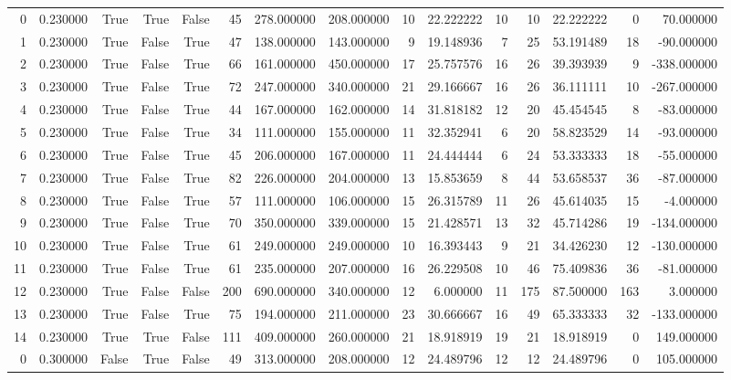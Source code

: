 \begin{table}[htbp]
\begin{tabular}{rrrrrrrrrrrrrrr}
0 & 0.230000 & True & True & False & 45 & 278.000000 & 208.000000 & 10 & 22.222222 & 10 & 10 & 22.222222 & 0 & 70.000000 \\
1 & 0.230000 & True & False & True & 47 & 138.000000 & 143.000000 & 9 & 19.148936 & 7 & 25 & 53.191489 & 18 & -90.000000 \\
2 & 0.230000 & True & False & True & 66 & 161.000000 & 450.000000 & 17 & 25.757576 & 16 & 26 & 39.393939 & 9 & -338.000000 \\
3 & 0.230000 & True & False & True & 72 & 247.000000 & 340.000000 & 21 & 29.166667 & 16 & 26 & 36.111111 & 10 & -267.000000 \\
4 & 0.230000 & True & False & True & 44 & 167.000000 & 162.000000 & 14 & 31.818182 & 12 & 20 & 45.454545 & 8 & -83.000000 \\
5 & 0.230000 & True & False & True & 34 & 111.000000 & 155.000000 & 11 & 32.352941 & 6 & 20 & 58.823529 & 14 & -93.000000 \\
6 & 0.230000 & True & False & True & 45 & 206.000000 & 167.000000 & 11 & 24.444444 & 6 & 24 & 53.333333 & 18 & -55.000000 \\
7 & 0.230000 & True & False & True & 82 & 226.000000 & 204.000000 & 13 & 15.853659 & 8 & 44 & 53.658537 & 36 & -87.000000 \\
8 & 0.230000 & True & False & True & 57 & 111.000000 & 106.000000 & 15 & 26.315789 & 11 & 26 & 45.614035 & 15 & -4.000000 \\
9 & 0.230000 & True & False & True & 70 & 350.000000 & 339.000000 & 15 & 21.428571 & 13 & 32 & 45.714286 & 19 & -134.000000 \\
10 & 0.230000 & True & False & True & 61 & 249.000000 & 249.000000 & 10 & 16.393443 & 9 & 21 & 34.426230 & 12 & -130.000000 \\
11 & 0.230000 & True & False & True & 61 & 235.000000 & 207.000000 & 16 & 26.229508 & 10 & 46 & 75.409836 & 36 & -81.000000 \\
12 & 0.230000 & True & False & False & 200 & 690.000000 & 340.000000 & 12 & 6.000000 & 11 & 175 & 87.500000 & 163 & 3.000000 \\
13 & 0.230000 & True & False & True & 75 & 194.000000 & 211.000000 & 23 & 30.666667 & 16 & 49 & 65.333333 & 32 & -133.000000 \\
14 & 0.230000 & True & True & False & 111 & 409.000000 & 260.000000 & 21 & 18.918919 & 19 & 21 & 18.918919 & 0 & 149.000000 \\
0 & 0.300000 & False & True & False & 49 & 313.000000 & 208.000000 & 12 & 24.489796 & 12 & 12 & 24.489796 & 0 & 105.000000 \\

\end{tabular}
\end{table}
